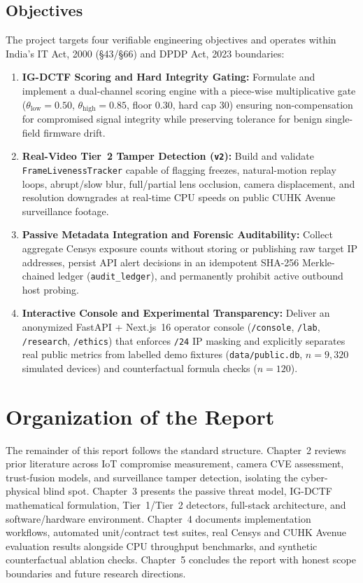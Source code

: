 \subsection*{Objectives}
The project targets four verifiable engineering objectives and operates within India's IT Act, 2000 (\S43/\S66) and DPDP Act, 2023 boundaries:
\begin{enumerate}
  \item \textbf{IG-DCTF Scoring and Hard Integrity Gating:} Formulate and implement a dual-channel scoring engine with a piece-wise multiplicative gate ($\theta_{\mathrm{low}} = 0.50$, $\theta_{\mathrm{high}} = 0.85$, floor $0.30$, hard cap $30$) ensuring non-compensation for compromised signal integrity while preserving tolerance for benign single-field firmware drift.
  \item \textbf{Real-Video Tier~2 Tamper Detection (\texttt{v2}):} Build and validate \texttt{FrameLivenessTracker} capable of flagging freezes, natural-motion replay loops, abrupt/slow blur, full/partial lens occlusion, camera displacement, and resolution downgrades at real-time CPU speeds on public CUHK Avenue surveillance footage.
  \item \textbf{Passive Metadata Integration and Forensic Auditability:} Collect aggregate Censys exposure counts without storing or publishing raw target IP addresses, persist API alert decisions in an idempotent SHA-256 Merkle-chained ledger (\texttt{audit\_ledger}), and permanently prohibit active outbound host probing.
  \item \textbf{Interactive Console and Experimental Transparency:} Deliver an anonymized FastAPI + Next.js~16 operator console (\texttt{/console}, \texttt{/lab}, \texttt{/research}, \texttt{/ethics}) that enforces \texttt{/24} IP masking and explicitly separates real public metrics from labelled demo fixtures (\texttt{data/public.db}, $n = 9,320$ simulated devices) and counterfactual formula checks ($n = 120$).
\end{enumerate}

\section{Organization of the Report}
The remainder of this report follows the standard structure. Chapter~2 reviews prior literature across IoT compromise measurement, camera CVE assessment, trust-fusion models, and surveillance tamper detection, isolating the cyber-physical blind spot. Chapter~3 presents the passive threat model, IG-DCTF mathematical formulation, Tier~1/Tier~2 detectors, full-stack architecture, and software/hardware environment. Chapter~4 documents implementation workflows, automated unit/contract test suites, real Censys and CUHK Avenue evaluation results alongside CPU throughput benchmarks, and synthetic counterfactual ablation checks. Chapter~5 concludes the report with honest scope boundaries and future research directions.
